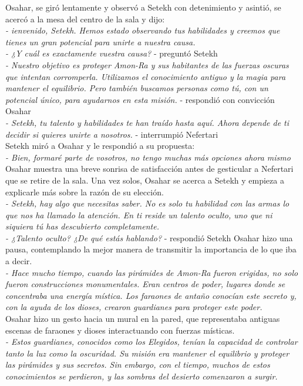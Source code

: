 Osahar, se giró lentamente y observó a Setekh con detenimiento y asintió, se acercó a la mesa del centro de la sala y dijo:\\
\textit{- ienvenido, Setekh. Hemos estado observando tus habilidades y creemos que tienes un gran potencial para unirte a nuestra causa.}\\
\textit{- ¿Y cuál es exactamente vuestra causa?} - preguntó Setekh\\
\textit{- Nuestro objetivo es proteger Amon-Ra y sus habitantes de las fuerzas oscuras que intentan corromperla. Utilizamos el conocimiento antiguo y la magia para mantener el equilibrio. Pero también buscamos personas como tú, con un potencial único, para ayudarnos en esta misión.} - respondió con convicción Osahar\\
\textit{- Setekh, tu talento y habilidades te han traído hasta aquí. Ahora depende de ti decidir si quieres unirte a nosotros.} - interrumpió Nefertari\\
Setekh miró a Osahar y le respondió a su propuesta:\\
\textit{- Bien, formaré parte de vosotros, no tengo muchas más opciones ahora mismo}\\
Osahar muestra una breve sonrisa de satisfacción antes de gesticular a Nefertari que se retire de la sala. Una vez solos, Osahar se acerca a Setekh y empieza a explicarle más sobre la razón de su elección.\\
\textit{- Setekh, hay algo que necesitas saber. No es solo tu habilidad con las armas lo que nos ha llamado la atención. En ti reside un talento oculto, uno que ni siquiera tú has descubierto completamente.}\\
\textit{- ¿Talento oculto? ¿De qué estás hablando?} - respondió Setekh
Osahar hizo una pausa, contemplando la mejor manera de transmitir la importancia de lo que iba a decir.\\
\textit{- Hace mucho tiempo, cuando las pirámides de Amon-Ra fueron erigidas, no solo fueron construcciones monumentales. Eran centros de poder, lugares donde se concentraba una energía mística. Los faraones de antaño conocían este secreto y, con la ayuda de los dioses, crearon guardianes para proteger este poder.}\\
Osahar hizo un gesto hacia un mural en la pared, que representaba antiguas escenas de faraones y dioses interactuando con fuerzas místicas.\\
\textit{- Estos guardianes, conocidos como los Elegidos, tenían la capacidad de controlar tanto la luz como la oscuridad. Su misión era mantener el equilibrio y proteger las pirámides y sus secretos. Sin embargo, con el tiempo, muchos de estos conocimientos se perdieron, y las sombras del desierto comenzaron a surgir.}\\
